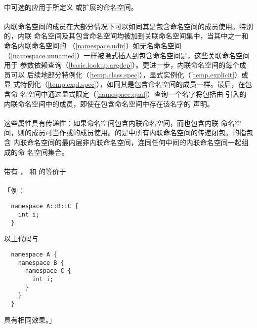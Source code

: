 \paragraph{}
中可选的应用于所定义
或扩展的命名空间。

\paragraph{}
内联命名空间的成员在大部分情况下可以如同其是包含命名空间的成员使用。特别的，内联
命名空间及其包含命名空间均被加到关联命名空间集中，当其中之一和命名内联命名空间的
（\ref{namespace.udir}）如无名命名空间
（\ref{namespace.unnamed}）一样被隐式插入到包含命名空间是，这些关联命名空间用于
参数依赖查询（\ref{basic.lookup.argdep}）。更进一步，内联命名空间的每个成员可以
后续地部分特例化（\ref{temp.class.spec}），显式实例化（\ref{temp.explicit}）或显
式特例化（\ref{temp.expl.spec}），如同其是包含命名空间的成员一样。最后，在包含命
名空间中通过显式限定（\ref{namespace.qual}）查询一个名字将包括由
引入的内联命名空间中的成员，即使在包含命名空间中存在该名字的
声明。

\paragraph{}
这些属性具有传递性：如果命名空间包含内联命名空间，而也包含内联
命名空间，则的成员可当作或的成员使用。的是中所有内联命名空间的传递闭包。的指包含
内联命名空间的最内层非内联命名空间，连同任何中间的内联命名空间一起组成的命
名空间集合。

\paragraph{}
带有 ， 和
 的等价于            \\
\mbox{\qquad {}}                      \\
「例：
\begin{lstlisting}
  namespace A::B::C {
    int i;
  }
\end{lstlisting}
以上代码与
\begin{lstlisting}
  namespace A {
    namespace B {
      namespace C {
        int i;
      }
    }
  }
\end{lstlisting}
具有相同效果。」

